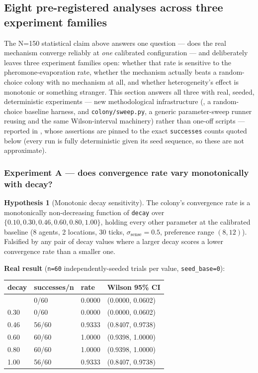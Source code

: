 \documentclass[
  english,
]{article}
\newcounter{none} %
\theoremstyle{definition}
\newtheorem{hypothesis}[theorem]{Hypothesis}
\begin{document}
\subsection{Eight pre-registered analyses across three experiment
families}\label{eight-pre-registered-analyses-across-three-experiment-families}

The N=150 statistical claim above answers one question --- does the real
mechanism converge reliably at \emph{one} calibrated configuration ---
and deliberately leaves three experiment families open: whether that
rate is sensitive to the pheromone-evaporation rate, whether the
mechanism actually beats a random-choice colony with no mechanism at
all, and whether heterogeneity's effect is monotonic or something
stranger. This section answers all three with real, seeded,
deterministic experiments --- new methodological infrastructure
(, a random-choice baseline harness, and
\texttt{colony/sweep.py}, a generic parameter-sweep runner reusing
 and the same Wilson-interval machinery)
rather than one-off scripts --- reported in
, whose
assertions are pinned to the exact \texttt{successes} counts quoted
below (every run is fully deterministic given its seed sequence, so
these are not approximate).

\subsubsection{Experiment A --- does convergence rate vary monotonically
with
decay?}\label{experiment-a-does-convergence-rate-vary-monotonically-with-decay}

\begin{hypothesis}[Monotonic decay sensitivity]
The colony's convergence rate is a monotonically non-decreasing function of \texttt{decay} over
\(\{0.10, 0.30, 0.46, 0.60, 0.80, 1.00\}\), holding every other parameter at the calibrated baseline
(8 agents, 2 locations, 30 ticks, \(\sigma_{\text{sense}}=0.5\), preference range \((8, 12)\)).
Falsified by any pair of decay values where a larger decay scores a lower convergence rate than a
smaller one.
\end{hypothesis}

\textbf{Real result} (\texttt{n=60} independently-seeded trials per
value, \texttt{seed\_base=0}):

{\def\LTcaptype{none} %
\begin{longtable}[]{@{}llll@{}}
\toprule\noalign{}
decay & successes/n & rate & Wilson 95\% CI \\
\midrule\noalign{}
\endhead
\bottomrule\noalign{}
\endlastfoot
0.10 & 0/60 & 0.0000 & (0.0000, 0.0602) \\
0.30 & 0/60 & 0.0000 & (0.0000, 0.0602) \\
0.46 & 56/60 & 0.9333 & (0.8407, 0.9738) \\
0.60 & 60/60 & 1.0000 & (0.9398, 1.0000) \\
0.80 & 60/60 & 1.0000 & (0.9398, 1.0000) \\
1.00 & 56/60 & 0.9333 & (0.8407, 0.9738) \\
\end{longtable}
}
\end{document}
